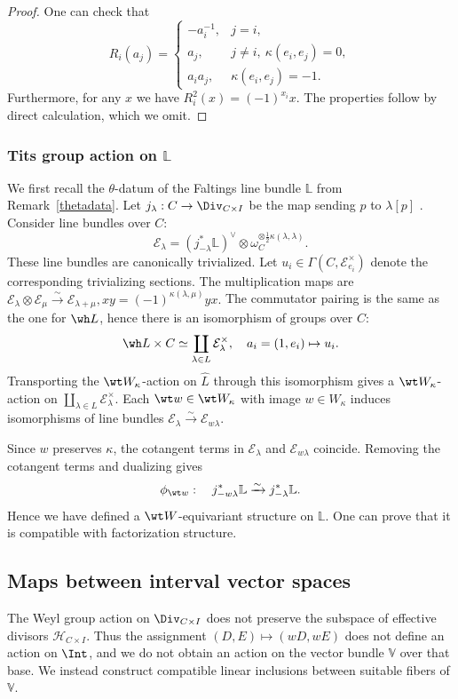 \documentclass{amsart}
\numberwithin{equation}{section}
\numberwithin{figure}{section}
\theoremstyle{definition}
\theoremstyle{remark}
\renewcommand{\c}[1]{\mathcal{#1}}
\renewcommand{\b}[1]{\mathbb{#1}}
\begin{document}
\begin{proof}
	One can check that 
$$		R_i(a_j)=
		\begin{cases}
			-a_i^{-1},&j=i,\\
			a_j,&j\ne i,\ \kappa(e_i,e_j)=0,\\
			a_i a_j,&\kappa(e_i,e_j)=-1.
		\end{cases}$$
	Furthermore, for any $x$ we have $R_i^2(x)=(-1)^{x_i} x$.
	The properties follow by direct calculation, which we omit.
\end{proof}

\subsubsection{Tits group action on $\b L$}
We first recall the $\theta$-datum of the Faltings line bundle $\b L$ from Remark~\ref{thetadata}.
Let $j_\lambda:C\to\Div_{C\times I}$ be the map sending $p$ to $\lambda[p]$
. Consider line bundles over $C$:
\[\c E_\lambda
=(j_{-\lambda}^*\b L)^\vee
\otimes\omega_C^{\otimes\frac12\kappa(\lambda,\lambda)}.
\]
These line bundles are canonically trivialized. Let \(u_i\in\Gamma(C,\c E_{e_i}^\times)\) denote the corresponding trivializing sections.
The multiplication maps are
$\c E_\lambda\otimes\c E_\mu\xrightarrow{\sim}\c E_{\lambda+\mu}, 
xy=(-1)^{\kappa(\lambda,\mu)}yx.$
The commutator pairing is the same as the one for $\wh L$, hence there is an isomorphism of groups over $C$: 
$$\wh L\times C
\simeq \coprod_{\lambda\in L}\c E_\lambda^\times, \quad a_i=(1,e_i)\mapsto u_i.$$  
Transporting the $\wt W_\kappa$-action on \(\widehat L\) through this isomorphism gives a $\wt W_\kappa$-action on
$\coprod_{\lambda\in L}\c E_\lambda^\times$.
Each $\wt w\in\wt W_\kappa$ with image $w\in W_\kappa$
 induces isomorphisms of line bundles
$\c E_\lambda\xrightarrow{\sim}\c E_{w\lambda}.$


Since $w$ preserves $\kappa$, the cotangent terms in
$\c E_{\lambda}$ and $\c E_{w\lambda}$ coincide.
Removing the cotangent terms and dualizing
gives
\[
\phi_{\wt w}:\quad j_{-w\lambda}^*\b L\xrightarrow{\sim}j_{-\lambda}^*\b L.
\]
Hence we have defined a $\wt W$-equivariant structure on $\b L$. One can prove that it is compatible with factorization structure. 



\subsection{Maps between interval vector spaces}
\label{subsec:tits-interval-maps}
The Weyl group action on $\Div_{C\times I}$ does not
preserve the subspace of effective divisors $\c H_{C\times I}$. Thus the assignment
$(D,E)\mapsto(wD,wE)$ does not define an action on $\Int$,
and we do not obtain an action on the vector bundle $\b V$
over that base. We instead construct compatible linear
inclusions between suitable fibers of $\b V$.
\end{document}
